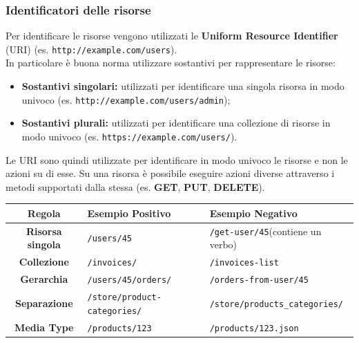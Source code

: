 \documentclass[12pt]{article}
\begin{document}
\subsubsection{Identificatori delle risorse}
Per identificare le risorse vengono utilizzati le \textbf{Uniform Resource Identifier} (URI) (es. \texttt{http://example.com/users}).\\
In particolare è buona norma utilizzare sostantivi per rappresentare le risorse:
\begin{itemize}
  \item \textbf{Sostantivi singolari:} utilizzati per identificare una singola risorsa in modo univoco (es. \texttt{http://example.com/users/admin});
  \item \textbf{Sostantivi plurali:} utilizzati per identificare una collezione di risorse in modo univoco (es. \texttt{https://example.com/users/}).
\end{itemize}
Le URI sono quindi utilizzate per identificare in modo univoco le risorse e non le azioni su di esse.
Su una risorsa è possibile eseguire azioni diverse attraverso i metodi supportati dalla stessa (es. \textbf{GET}, \textbf{PUT}, \textbf{DELETE}).
\begin{center}
\begin{tabularx}{\textwidth}{ |c|X|X| }
\hline
\textbf{Regola} & \textbf{Esempio Positivo} & \textbf{Esempio Negativo}\\
\hline\hline
\textbf{Risorsa singola} & \texttt{/users/45} & \texttt{/get-user/45}\newline(contiene un verbo)\\
\hline
\textbf{Collezione} & \texttt{/invoices/} & \texttt{/invoices-list}\\
\hline
\textbf{Gerarchia} & \texttt{/users/45/orders/} & \texttt{/orders-from-user/45}\\
\hline
\textbf{Separazione} & \texttt{/store/product-categories/} & \texttt{/store/products\_categories/}\\
\hline
\textbf{Media Type} & \texttt{/products/123} & \texttt{/products/123.json}\\
\hline
\end{tabularx}
\end{center}
\end{document}
